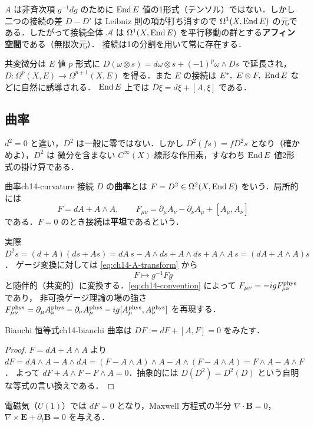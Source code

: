 $A$ は非斉次項 $g^{-1}dg$ のために $\operatorname{End} E$ 値の1形式（テンソル）ではない．しかし二つの接続の差 $D-D'$ は
Leibniz 則の項が打ち消すので $\Omega^1(X,\operatorname{End} E)$ の元である．したがって接続全体 $\mathcal{A}$ は
$\Omega^1(X,\operatorname{End} E)$ を平行移動の群とする\textbf{アフィン空間}である（無限次元）．
接続は1の分割を用いて常に存在する．

共変微分は $E$ 値 $p$ 形式に $D(\omega\otimes s) = d\omega\otimes s + (-1)^p\omega\wedge Ds$ で延長され，
$D:\Omega^p(X,E)\to\Omega^{p+1}(X,E)$ を得る．また $E$ の接続は $E^*,\ E\otimes F,\ \operatorname{End} E$ などに自然に誘導される．
$\operatorname{End} E$ 上では $D\xi = d\xi + [A,\xi]$ である．

\subsection{曲率}

$d^2=0$ と違い，$D^2$ は一般に零ではない．しかし $D^2(fs) = f D^2 s$ となり（確かめよ），$D^2$ は
微分を含まない $C^\infty(X)$-線形な作用素，すなわち $\operatorname{End} E$ 値2形式の掛け算である．

\begin{mydef}{曲率}{ch14-curvature}
接続 $D$ の\textbf{曲率}とは $F=D^2\in\Omega^2(X,\operatorname{End} E)$ をいう．局所的には
\begin{equation}
  F = dA + A\wedge A,\qquad F_{\mu\nu} = \partial_\mu A_\nu - \partial_\nu A_\mu + [A_\mu,A_\nu]
\end{equation}
である．$F=0$ のとき接続は\textbf{平坦}であるという．
\end{mydef}

実際 $D^2s = (d+A)(ds + As) = dA\,s - A\wedge ds + A\wedge ds + A\wedge A\,s = (dA + A\wedge A)s$．
ゲージ変換に対しては \eqref{eq:ch14-A-transform} から
\begin{equation}
  F\mapsto g^{-1}Fg
\end{equation}
と随伴的（共変的）に変換する．\eqref{eq:ch14-convention} によって $F_{\mu\nu}=-igF^{\rm phys}_{\mu\nu}$ であり，
非可換ゲージ理論の場の強さ $F^{\rm phys}_{\mu\nu}=\partial_\mu A^{\rm phys}_\nu-\partial_\nu A^{\rm phys}_\mu-ig[A^{\rm phys}_\mu,A^{\rm phys}_\nu]$ を再現する．

\begin{myprop}{Bianchi 恒等式}{ch14-bianchi}
曲率は $DF := dF + [A,F] = 0$ をみたす．
\end{myprop}
\begin{proof}
$F=dA+A\wedge A$ より $dF = dA\wedge A - A\wedge dA = (F-A\wedge A)\wedge A - A\wedge(F-A\wedge A) = F\wedge A - A\wedge F$．
よって $dF + A\wedge F - F\wedge A = 0$．抽象的には $D(D^2)=D^2(D)$ という自明な等式の言い換えである．
\end{proof}
電磁気（$U(1)$）では $dF=0$ となり，Maxwell 方程式の半分 $\nabla\cdot\mathbf{B}=0$，$\nabla\times\mathbf{E}+\partial_t\mathbf{B}=0$ を与える．

